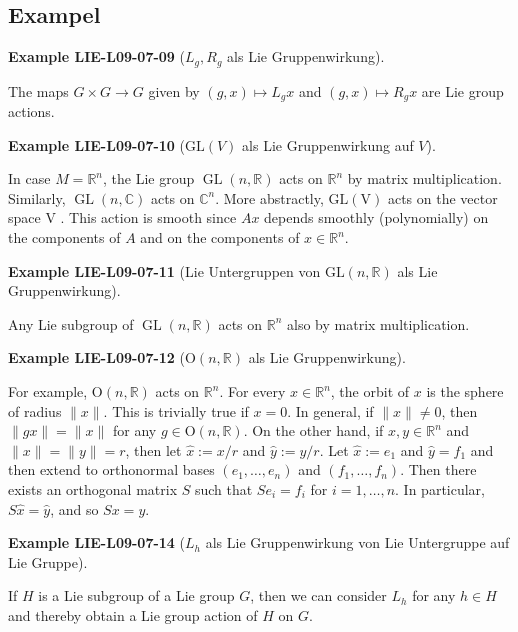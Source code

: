 \documentclass[10pt, letterpaper]{article}
\newcommand{\R}{\mathbb{R}}
\newcommand{\GL}{\mathrm{GL}}
\newcommand{\Ogroup}{\mathrm{O}} %
\newcommand{\CustomHeading}[3]{%
  \par\medskip\noindent%
  \textbf{#1 #2} \textnormal{(#3)}.\enskip%
}
\newenvironment{EXA}[2]{\CustomHeading{Example}{#1}{#2}}{}
\begin{document}
\subsection{Exampel}

\begin{EXA}{LIE-L09-07-09}{$L_g,R_g$ als Lie Gruppenwirkung}
The maps $G \times G \rightarrow G$ given by $(g, x) \mapsto L_{g} x$ and $(g, x) \mapsto R_{g} x$ are Lie group actions.
\end{EXA}

\begin{EXA}{LIE-L09-07-10}{$\GL(V)$ als Lie Gruppenwirkung auf $V$}
In case $M=\mathbb{R}^{n}$, the Lie group $\operatorname{GL}(n, \mathbb{R})$ acts on $\mathbb{R}^{n}$ by matrix multiplication. Similarly, $\operatorname{GL}(n, \mathbb{C})$ acts on $\mathbb{C}^{n}$. More abstractly, $\mathrm{GL}(\mathrm{V})$ acts on the vector space V . This action is smooth since $A x$ depends smoothly (polynomially) on the components of $A$ and on the components of $x \in \mathbb{R}^{n}$.
\end{EXA}

\begin{EXA}{LIE-L09-07-11}{Lie Untergruppen von $\GL(n,\R)$ als Lie Gruppenwirkung}
Any Lie subgroup of $\operatorname{GL}(n, \mathbb{R})$ acts on $\mathbb{R}^{n}$ also by matrix multiplication.
\end{EXA}

\begin{EXA}{LIE-L09-07-12}{$\Ogroup(n,\R)$ als Lie Gruppenwirkung}
For example, $\mathrm{O}(n, \mathbb{R})$ acts on $\mathbb{R}^{n}$. For every $x \in \mathbb{R}^{n}$, the orbit of $x$ is the sphere of radius $\|x\|$. This is trivially true if $x=0$. In general, if $\|x\| \neq 0$, then $\|g x\|=\|x\|$ for any $g \in \mathrm{O}(n, \mathbb{R})$. On the other hand, if $x, y \in \mathbb{R}^{n}$ and $\|x\|=\|y\|=r$, then let $\widehat{x}:=x / r$ and $\widehat{y}:=y / r$. Let $\widehat{x}:=e_{1}$ and $\widehat{y}=f_{1}$ and then extend to orthonormal bases $\left(e_{1}, \ldots, e_{n}\right)$ and $\left(f_{1}, \ldots, f_{n}\right)$. Then there exists an orthogonal matrix $S$ such that $S e_{i}=f_{i}$ for $i=1, \ldots, n$. In particular, $S \widehat{x}=\widehat{y}$, and so $S x=y$.
\end{EXA}

\begin{EXA}{LIE-L09-07-14}{$L_h$ als Lie Gruppenwirkung von Lie Untergruppe auf Lie Gruppe}
If $H$ is a Lie subgroup of a Lie group $G$, then we can consider $L_{h}$ for any $h \in H$ and thereby obtain a Lie group action of $H$ on $G$.
\end{EXA}
\end{document}
